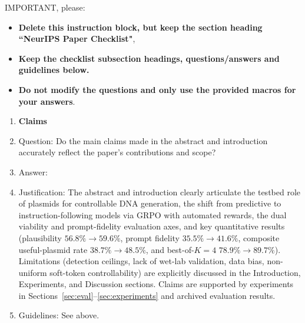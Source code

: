 IMPORTANT, please:
\begin{itemize}
    \item {\bf Delete this instruction block, but keep the section heading ``NeurIPS Paper Checklist"},
    \item  {\bf Keep the checklist subsection headings, questions/answers and guidelines below.}
    \item {\bf Do not modify the questions and only use the provided macros for your answers}.
\end{itemize} 
 



\begin{enumerate}

\item {\bf Claims}
    \item[] Question: Do the main claims made in the abstract and introduction accurately reflect the paper's contributions and scope?
    \item[] Answer: \answerYes{}
    \item[] Justification: The abstract and introduction clearly articulate the testbed role of plasmids for controllable DNA generation, the shift from predictive to instruction-following models via GRPO with automated rewards, the dual viability and prompt-fidelity evaluation axes, and key quantitative results (plausibility $56.8\% \to 59.6\%$, prompt fidelity $35.5\% \to 41.6\%$, composite useful-plasmid rate $38.7\% \to 48.5\%$, and best-of-$K{=}4$ $78.9\% \to 89.7\%$). Limitations (detection ceilings, lack of wet-lab validation, data bias, non-uniform soft-token controllability) are explicitly discussed in the Introduction, Experiments, and Discussion sections. Claims are supported by experiments in Sections~\ref{sec:eval}--\ref{sec:experiments} and archived evaluation results.
    \item[] Guidelines: See above.


\end{enumerate}
